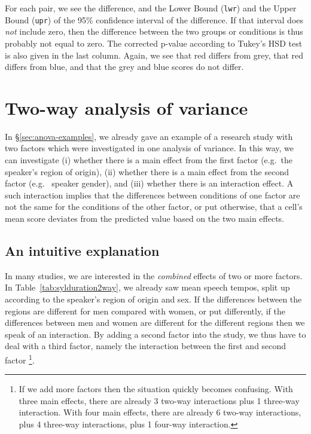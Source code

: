 \documentclass[
]{book}
\begin{document}
For each pair, we see the difference, and the Lower Bound (\texttt{lwr}) and
the Upper Bound (\texttt{upr}) of the 95\% confidence interval
of the difference. If that interval does \emph{not} include zero, then
the difference between the two groups or conditions is thus probably not
equal to zero. The corrected p-value according to
Tukey's HSD test is also given in the last column.
Again, we see that red differs from grey, that red differs from
blue, and that the grey and blue scores do not differ.

\hypertarget{two-way-analysis-of-variance}{%
\section{Two-way analysis of variance}\label{two-way-analysis-of-variance}}

In §\ref{sec:anova-examples}, we already gave an example
of a research study with two factors which were investigated in one analysis
of variance. In this way, we can investigate (i) whether there is a
main effect from the first factor (e.g.~the speaker's region of origin),
(ii) whether there is a main effect from the second factor (e.g.~
speaker gender), and (iii) whether there is an interaction effect.
A such interaction implies that the differences between conditions of
one factor are not the same
for the conditions of the other factor, or put otherwise, that a cell's mean
score deviates from the predicted value based on the two main effects.

\hypertarget{an-intuitive-explanation}{%
\subsection{An intuitive explanation}\label{an-intuitive-explanation}}

In many studies, we are interested in the \emph{combined} effects
of two or more factors. In
Table~\ref{tab:sylduration2way}, we already saw mean speech tempos,
split up according to the speaker's region of origin and sex.
If the differences between the regions are different for men compared with
women, or put differently, if the differences between men and women are
different for the different regions then we speak of an interaction. By adding
a second factor into the study, we thus have to deal with a third factor,
namely the interaction between
the first and second factor
\footnote{If we add more factors then the situation quickly becomes confusing.
  With three main effects, there are already 3 two-way interactions plus 1 three-way
  interaction. With four main effects, there are already 6 two-way interactions, plus
  4 three-way interactions, plus 1 four-way interaction.}.
\end{document}
